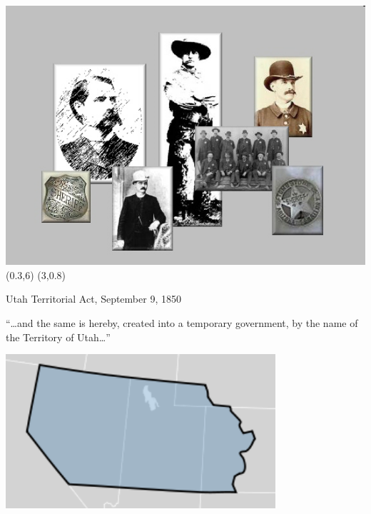 \unitlength=1in
\begin{frame}
    \centering
    \includegraphics[width=.9\textwidth]{img/sheriffs.png} \\
    \pause
    \Put(0.3,6){\textbf{}}
    \pause
    \Put(3,0.8){\textbf{}}
\end{frame}

\begin{frame}{Utah Territorial Act, September 9, 1850}
    \centering
    \begin{block}{}
        ``\ldots and the same is hereby, created into a temporary government, by the name of the Territory of Utah\ldots''
    \end{block}
    \vspace{10pt}
    \includegraphics[width=0.75\textwidth]{img/utah-terr.png} \\
\end{frame}

